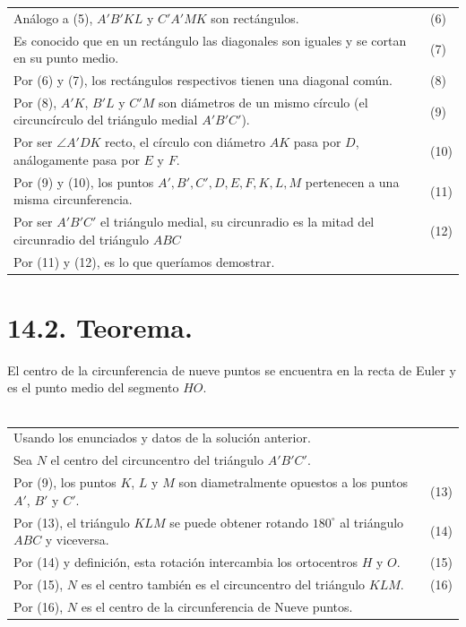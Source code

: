 \documentclass[12pt,a4paper, oneside]{book}
\begin{document}
\begin{tabular}{p{15.9 cm} p{1cm}}
\\ Análogo a (5), $A'B'KL$ y $C'A'MK$ son rectángulos. &(6)
\\Es conocido que en un rectángulo las diagonales son iguales y se cortan en su punto medio. &\medskip(7)
\\Por (6) y (7), los rectángulos respectivos tienen una diagonal común. &(8)
\\ Por (8), $A'K$, $B'L$ y $C'M$ son diámetros de un mismo círculo (el circuncírculo del triángulo medial $A'B'C'$). &\medskip (9)
\\Por ser $\angle A'DK$ recto, el círculo con diámetro $AK$ pasa por $D$, análogamente pasa por $E$ y $F$. &\medskip(10)
\\Por (9) y (10), los puntos $A', B', C', D, E ,F, K, L, M$ pertenecen a una misma circunferencia. &\medskip(11)
\\Por ser $A'B'C'$ el triángulo medial, su circunradio es la mitad del circunradio del triángulo $ABC$ &\medskip(12)
\\Por (11) y (12), es lo que queríamos demostrar.
\end{tabular}
\section{14.2. Teorema.}
El centro de la circunferencia de nueve puntos se encuentra en la recta de Euler y es el punto medio del segmento $HO$.\\\\
\begin{tabular}{p{15.9cm} p{1 cm}}
Usando los enunciados y datos de la solución anterior.
\\Sea $N$ el centro del circuncentro del triángulo $A'B'C'$.
\\Por (9), los puntos $K$, $L$ y $M$ son diametralmente opuestos a los puntos $A'$, $B'$ y $C'$. & (13)
\\Por (13), el triángulo $KLM$ se puede obtener rotando $180^\circ$ al triángulo $ABC$ y viceversa.  &(14)
\\Por (14) y definición, esta rotación intercambia los ortocentros $H$ y $O$.&(15)
\\Por (15), $N$ es el centro también es el circuncentro del triángulo $KLM$. & (16)
\\Por (16), $N$ es el centro de la circunferencia de Nueve puntos.
\end{tabular}
\end{document}
